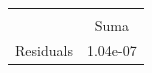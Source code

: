 {
\def\sym#1{\ifmmode^{#1}\else\(^{#1}\)\fi}
\begin{tabular}{l*{1}{c}}
\toprule
                    &\multicolumn{1}{c}{}\\
                    &        Suma\\
\midrule
Residuals           &    1.04e-07\\
\bottomrule
\end{tabular}
}
